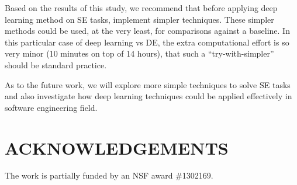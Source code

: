 \documentclass[sigconf]{acmart}
\theoremstyle{break}
\begin{document}
Based on the results of this study, we recommend that before applying 
deep learning method on SE tasks, implement
  simpler techniques.
  These simpler methods could be used,
  at the very least, for comparisons against a baseline.
  In this particular case of deep learning vs DE, the extra computational effort  is so very minor (10 minutes on top of 14 hours), 
  that such a ``try-with-simpler'' should
  be standard practice.
  

As to the future work, we will explore more simple techniques to solve SE tasks and also
investigate how deep learning techniques could be applied effectively in software engineering
field. 

\section*{ACKNOWLEDGEMENTS}
The work is partially funded by an NSF award \#1302169.



\balance
 
\end{document}
